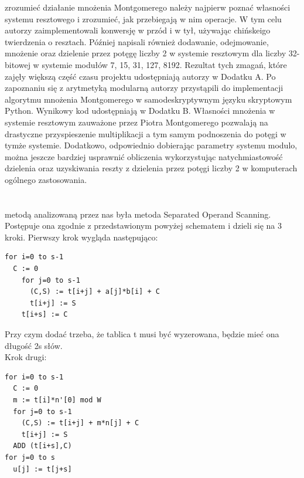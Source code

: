 \documentclass[10pt,journal,compsoc]{IEEEtran}
\begin{document}
 zrozumieć działanie mnożenia Montgomerego należy najpierw poznać własności systemu resztowego i zrozumieć, jak przebiegają w nim operacje. W tym celu autorzy zaimplementowali konwersję w przód i w tył, używając chińskeigo twierdzenia o resztach. Później napisali również dodawanie, odejmowanie, mnożenie oraz dzielenie przez potęgę liczby 2 w systemie resztowym dla liczby 32-bitowej w systemie modułów 7, 15, 31, 127, 8192. Rezultat tych zmagań, które zajęły większą część czasu projektu udostępniają autorzy w Dodatku A. Po zapoznaniu się z arytmetyką modularną autorzy przystąpili do implementacji algorytmu mnożenia Montgomerego w samodeskryptywnym języku skryptowym Python. Wynikowy kod udostępniają w Dodatku B. Własności mnożenia w systemie resztowym zauważone przez Piotra Montgomerego pozwalają na drastyczne przyspieszenie multiplikacji a tym samym podnoszenia do potęgi w tymże systemie. Dodatkowo, odpowiednio dobierając parametry systemu modulo, można jeszcze bardziej usprawnić obliczenia wykorzystując natychmiastowość dzielenia oraz uzyskiwania reszty z dzielenia przez potęgi liczby 2 w komputerach ogólnego zastosowania.\\\\\\

 metodą analizowaną przez nas była metoda Separated Operand Scanning. Postępuje ona zgodnie z przedstawionym powyżej schematem i dzieli się na 3 kroki.
Pierwszy krok wygląda następująco:
\begin{lstlisting}
for i=0 to s-1
  C := 0
    for j=0 to s-1
      (C,S) := t[i+j] + a[j]*b[i] + C
      t[i+j] := S
    t[i+s] := C
\end{lstlisting}

\noindent Przy czym dodać trzeba, że tablica t musi być wyzerowana, będzie mieć ona długość 2s słów.\\ Krok drugi: 
\begin{lstlisting}
for i=0 to s-1
  C := 0
  m := t[i]*n'[0] mod W
  for j=0 to s-1
    (C,S) := t[i+j] + m*n[j] + C
    t[i+j] := S
  ADD (t[i+s],C)
for j=0 to s
  u[j] := t[j+s]
\end{lstlisting}
\end{document}

